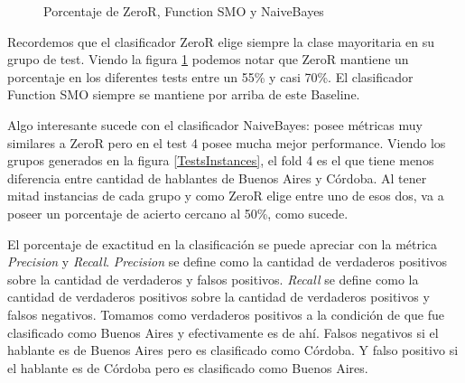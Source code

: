 \begin{figure}[H]
\centering
{}
\caption{Porcentaje de ZeroR, Function SMO y NaiveBayes}
\label{porcentajexClasificador}
\end{figure}

Recordemos que el clasificador ZeroR elige siempre la clase mayoritaria en su grupo de test. Viendo la figura \ref{porcentajexClasificador} podemos notar que ZeroR mantiene un porcentaje en los diferentes tests entre un 55\% y casi 70\%. El clasificador Function SMO siempre se mantiene por arriba de este Baseline.

Algo interesante sucede con el clasificador NaiveBayes: posee métricas muy similares a ZeroR pero en el test 4 posee mucha mejor performance. Viendo los grupos generados en la figura \ref{TestsInstances}, el fold 4 es el que tiene menos diferencia entre cantidad de hablantes de Buenos Aires y Córdoba. Al tener mitad instancias de cada grupo y como ZeroR elige entre uno de esos dos, va a poseer un porcentaje de acierto cercano al 50\%, como sucede.  

El porcentaje de exactitud en la clasificación se puede apreciar con la métrica \textit{Precision} y \textit{Recall}. \textit{Precision} se define como la cantidad de verdaderos positivos sobre la cantidad de verdaderos y falsos positivos. \textit{Recall} se define como la cantidad de verdaderos positivos sobre la cantidad de verdaderos positivos y falsos negativos. Tomamos como verdaderos positivos a la condición de que fue clasificado como Buenos Aires y efectivamente es de ahí. Falsos negativos si el hablante es de Buenos Aires pero es clasificado como Córdoba. Y falso positivo si el hablante es de Córdoba pero es clasificado como Buenos Aires. 

